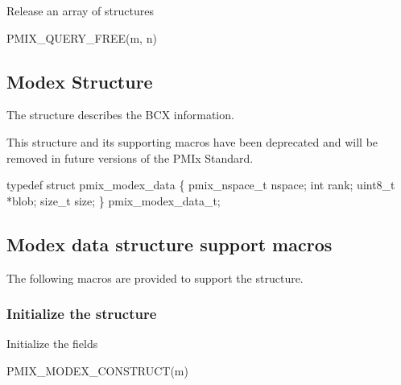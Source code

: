 Release an array of  structures

\cspecificstart
\begin{codepar}
PMIX_QUERY_FREE(m, n)
\end{codepar}
\cspecificend

\begin{arglist}
\end{arglist}

\subsection{Modex Structure}

The  structure describes the \ac{BCX} information.

\notestart
\noteheader
This structure and its supporting macros have been deprecated and will be removed in future versions of the \ac{PMIx} Standard.
\noteend

\cspecificstart
\begin{codepar}
typedef struct pmix_modex_data \{
    pmix_nspace_t nspace;
    int rank;
    uint8_t *blob;
    size_t size;
\} pmix_modex_data_t;
\end{codepar}
\cspecificend

\subsection{Modex data structure support macros}
The following macros are provided to support the  structure.

\subsubsection{Initialize the  structure}

Initialize the  fields

\cspecificstart
\begin{codepar}
PMIX_MODEX_CONSTRUCT(m)
\end{codepar}
\cspecificend

\begin{arglist}
\end{arglist}

